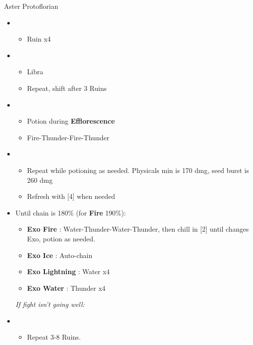 \begin{paracol}{2}
\begin{battle}{Aster Protoflorian}
		\begin{itemize}
			\item \first
			      \begin{itemize}
				      \item Ruin x4
			      \end{itemize}
			\item \third
			      \begin{itemize}
				      \item Libra
				      \item Repeat, shift after 3 Ruins
			      \end{itemize}
			\item \fourth
			      \begin{itemize}
				      \item Potion during \textbf{Efflorescence}
				      \item Fire-Thunder-Fire-Thunder
			      \end{itemize}
			\item \fifth
			      \begin{itemize}
				      \item Repeat while potioning as needed. Physicals min is 170 dmg, seed burst is 260 dmg
				      \item Refresh with [4] when needed
			      \end{itemize}
			\item Until chain is 180\% (for \textbf{Fire} 190\%):
			      \begin{itemize}
				      \item \textbf{Exo Fire} : Water-Thunder-Water-Thunder, then chill in [2] until changes Exo, potion as needed.
				      \item \textbf{Exo Ice} : Auto-chain
				      \item \textbf{Exo Lightning} : Water x4
				      \item \textbf{Exo Water} : Thunder x4
			      \end{itemize}
			      {\it If fight isn't going well:}
			\item \first
			      \begin{itemize}
				      \item Repeat 3-8 Ruins.
			      \end{itemize}


\end{itemize}
\end{battle}
\end{paracol}
